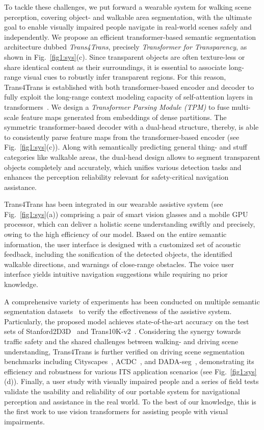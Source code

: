 \documentclass[journal]{IEEEtran}
\begin{document}
To tackle these challenges, we put forward a wearable system for walking scene perception, covering object- and walkable area segmentation, with the ultimate goal to enable visually impaired people navigate in real-world scenes safely and independently. We propose an efficient transformer-based semantic segmentation architecture dubbed \emph{Trans4Trans}, precisely \emph{Transformer for Transparency}, as shown in Fig.~\ref{fig1:sys}(c). Since transparent objects are often texture-less or share identical content as their surroundings, it is essential to associate long-range visual cues to robustly infer transparent regions.
For this reason, Trans4Trans is established with both transformer-based encoder and decoder to fully exploit the long-range context modeling capacity of self-attention layers in transformers~\cite{vaswani2017attention}.
We design a \emph{Transformer Parsing Module (TPM)} to fuse multi-scale feature maps generated from embeddings of dense partitions. The symmetric transformer-based decoder with a dual-head structure, thereby, is able to consistently parse feature maps from the transformer-based encoder (see Fig.~\ref{fig1:sys}(c)). Along with semantically predicting general thing- and stuff categories like walkable areas, the dual-head design allows to segment transparent objects completely and accurately, which unifies various detection tasks and enhances the perception reliability relevant for safety-critical navigation assistance.

Trans4Trans has been integrated in our wearable assistive system (see Fig.~\ref{fig1:sys}(a)) comprising a pair of smart vision glasses and a mobile GPU processor, which can deliver a holistic scene understanding swiftly and precisely, owing to the high efficiency of our model. Based on the entire semantic information, the user interface is designed with a customized set of acoustic feedback, including the sonification of the detected objects, the identified walkable directions, and warnings of close-range obstacles. The voice user interface yields intuitive navigation suggestions while requiring no prior knowledge.

A comprehensive variety of experiments has been conducted on multiple semantic segmentation datasets~\cite{stanford2d3d,xie2021segmenting} to verify the effectiveness of the assistive system. Particularly, the proposed model achieves state-of-the-art accuracy on the test sets of Stanford2D3D~\cite{stanford2d3d} and Trans10K-v2~\cite{xie2021segmenting}.
Considering the synergy towards traffic safety and the shared challenges between walking- and driving scene understanding, Trans4Trans is further verified on driving scene segmentation benchmarks including Cityscapes~\cite{cityscapes}, ACDC~\cite{sakaridis2021acdc}, and DADA-seg~\cite{zhang2021issafe}, demonstrating its efficiency and robustness for various ITS application scenarios (see Fig.~\ref{fig1:sys}(d)). Finally, a user study with visually impaired people and a series of field tests validate the usability and reliability of our portable system for navigational perception and assistance in the real world. To the best of our knowledge, this is the first work to use vision transformers for assisting people with visual impairments. 
\end{document}
